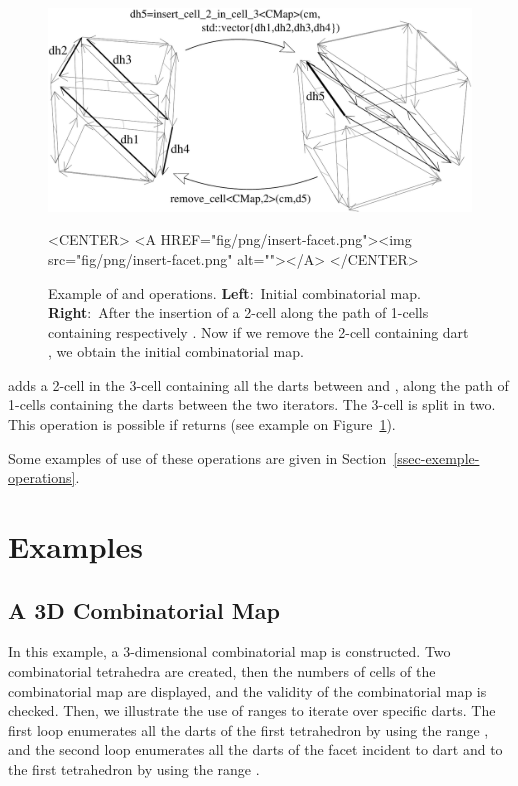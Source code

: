 \begin{figure}[htb]
  \begin{ccTexOnly}
    \begin{center}
      \includegraphics[width=.75\textwidth]{Combinatorial_map/fig/pdf/insert-facet}
    \end{center}
  \end{ccTexOnly}
  \begin{ccHtmlOnly}
    <CENTER> <A HREF="fig/png/insert-facet.png"><img
    src="fig/png/insert-facet.png" alt=""></A> </CENTER>
  \end{ccHtmlOnly}
  \caption{Example of  and
     operations. \textbf{Left}:~Initial
    combinatorial map.  \textbf{Right}:~After the insertion of a
    2-cell along the path of 1-cells containing respectively
    .  Now if we remove the 2-cell containing dart
    , we obtain the initial combinatorial map.}
  \label{fig-insert-face}
\end{figure}

{} adds a
2-cell in the 3-cell containing all the darts between
 and , along the path of 1-cells
containing the darts between the two iterators. The 3-cell is
split in two. This operation is possible if
 returns
 (see example on Figure~\ref{fig-insert-face}).

Some examples of use of these operations are given in
Section~\ref{ssec-exemple-operations}.

\section{Examples}

\subsection{A 3D Combinatorial Map}\label{ssec-example-3DCM}
In this example, a 3-dimensional combinatorial map is constructed. Two
combinatorial tetrahedra are created, then the numbers of cells of the
combinatorial map are displayed, and the validity of the combinatorial
map is checked.  Then, we illustrate the use of ranges to iterate over
specific darts.  The first loop enumerates all the darts of the first
tetrahedron by using the range , and the
second loop enumerates all the darts of the facet incident to dart
 and to the first tetrahedron by using the range
.

